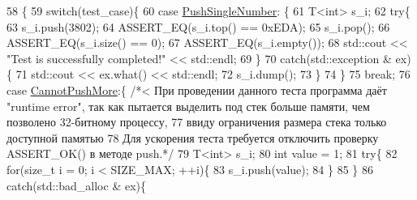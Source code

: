 \begin{DoxyCode}
58                             \{
59         \textcolor{keywordflow}{switch}(test\_case)\{                                                    
60             \textcolor{keywordflow}{case} \hyperlink{namespacestk__test_aee7ec7a767abf7b0b65ce9a2afb7de78a16992c4d9ecd605ea8503740aee9df96}{PushSingleNumber}:  \{                                        
61                 T<int> s\_i;                                                 
62                 \textcolor{keywordflow}{try}\{                                                                                                
63                     s\_i.push(3802);                                         
64                     ASSERT\_EQ(s\_i.top() == 0xEDA);
65                     s\_i.pop();
66                     ASSERT\_EQ(s\_i.size() == 0);
67                     ASSERT\_EQ(s\_i.empty());
68                     std::cout << \textcolor{stringliteral}{"Test is successfully completed!"} << std::endl;
69                 \}                                                               
70                 \textcolor{keywordflow}{catch}(std::exception & ex)\{                                                
71                     std::cout << ex.what() << std::endl;
72                     s\_i.dump();
73                 \} 
74                                     \}                                                           
75                 \textcolor{keywordflow}{break}; 
76             \textcolor{keywordflow}{case} \hyperlink{namespacestk__test_aee7ec7a767abf7b0b65ce9a2afb7de78a6e2bd84a1d3046f2c01c930a1d52be64}{CannotPushMore}:\{ \textcolor{comment}{/*< При проведении данного теста программа даёт "runtime
       error", так как пытается выделить под стек больше памяти, чем позволено 32-битному процессу,}
77 \textcolor{comment}{                                   ввиду ограничения размера стека только доступной памятью                                                                                     
       }
78 \textcolor{comment}{                                   Для ускорения теста требуется отключить проверку ASSERT\_OK() в методе
       push.*/}
79                 T<int> s\_i; 
80                 \textcolor{keywordtype}{int} value = 1;
81                 \textcolor{keywordflow}{try}\{
82                     \textcolor{keywordflow}{for}(\textcolor{keywordtype}{size\_t} i = 0; i < SIZE\_MAX; ++i)\{
83                         s\_i.push(value);
84                     \}
85                 \}
86                 \textcolor{keywordflow}{catch}(std::bad\_alloc & ex)\{

\end{DoxyCode}
